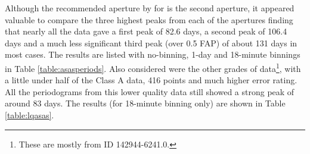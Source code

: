 
Although the recommended aperture by {\asas} for {\prox} is the second aperture, it appeared valuable to compare the
three highest peaks from each of the apertures finding that nearly all the data gave a first peak of 82.6 days, a second
peak of 106.4 days and a much less significant third peak (over 0.5 FAP) of about 131 days in most cases. The results
are listed with no-binning, 1-day and 18-minute binnings in Table \ref{table:asasperiods}. Also considered were the
other grades of {\asas} data\footnote{These are mostly from ID 142944-6241.0.}, with a little under half of the Class A
data, 416 points and much higher error rating. All the periodograms from this lower quality data still showed a strong
peak of around 83 days. The results (for 18-minute binning only) are shown in Table \ref{table:lqasas}.

\begin{table}[!htbp]
\centering
{}
\caption{Summary of three strongest periods taken from Class A values in {\asas} dataset for {\prox} from all apertures based upon magnitudes measured
  between December 2000 and September 2009. Results are shown for the raw data. 1-day binning and 18-minute binning.}
\protect\label{table:asasperiods}
\end{table}


